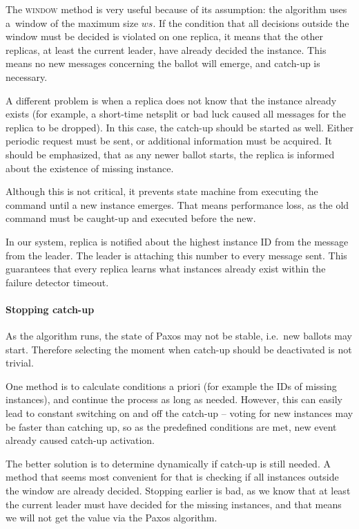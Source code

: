The \textsc{window} method is very useful because of its assumption: the algorithm uses a~window of the maximum size $ws$. If the condition that all decisions outside the window must be decided is violated on one replica, it means that the other replicas, at least the current leader, have already decided the instance. This means no new messages concerning the ballot will emerge, and catch-up is necessary.

A different problem is when a replica does not know that the instance already exists (for example, a short-time netsplit or bad luck caused all messages for the replica to be dropped). In this case, the catch-up should be started as well. 
Either periodic request must be sent, or additional information must be acquired. It should be emphasized, that as any newer ballot starts, the replica is informed about the existence of missing instance.

Although this is not critical, it prevents state machine from executing the command until a new instance emerges. That means performance loss, as the old command must be caught-up and executed before the new.

In our system, replica is notified about the highest instance ID from the \alive message from the leader. The leader is attaching this number to every \alive message sent. This guarantees that every replica learns what instances already exist within the failure detector timeout.

\paragraph*{Stopping catch-up} As the algorithm runs, the state of Paxos may not be stable, \linebreak i.e.\ new ballots may start. Therefore selecting the moment when catch-up should be deactivated is not trivial.

One method is to calculate conditions a priori (for example the IDs of missing instances), and continue the process as long as needed. However, this can easily lead to constant switching on and off the catch-up -- voting for new instances may be faster than catching up, so as the predefined conditions are met, new event already caused catch-up activation.

The better solution is to determine dynamically if catch-up is still needed. A method that seems most convenient for that is checking if all instances outside the window are already decided. Stopping earlier is bad, as we know that at least the current leader must have decided for the missing instances, and that means we will not get the value via the Paxos algorithm.

